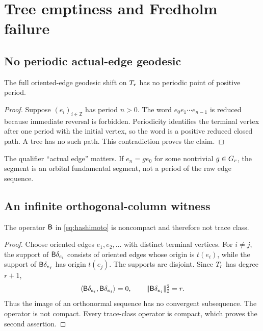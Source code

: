 \section{Tree emptiness and Fredholm failure}
\label{sec:tree-fredholm}

\subsection{No periodic actual-edge geodesic}

\begin{lemma}
\label{lem:no-period}
The full oriented-edge geodesic shift on $T_r$ has no periodic point of
positive period.
\end{lemma}

\begin{proof}
Suppose $(e_i)_{i\in\mathbb Z}$ has period $n>0$.  The word
$e_0e_1\cdots e_{n-1}$ is reduced because immediate reversal is forbidden.
Periodicity identifies the terminal vertex after one period with the initial
vertex, so the word is a positive reduced closed path.  A tree has no such
path.  This contradiction proves the claim.
\end{proof}

The qualifier ``actual edge'' matters.  If $e_n=g e_0$ for some nontrivial
$g\in G_r$, the segment is an orbital fundamental segment, not a period of the
raw edge sequence.

\subsection{An infinite orthogonal-column witness}

\begin{proposition}[Noncompactness]
\label{prop:noncompact}
The operator $\mathsf{B}$ in \eqref{eq:hashimoto} is noncompact and therefore not
trace class.
\end{proposition}

\begin{proof}
Choose oriented edges $e_1,e_2,\ldots$ with distinct terminal vertices.  For
$i\ne j$, the support of $\mathsf{B}\delta_{e_i}$ consists of oriented edges whose
origin is $t(e_i)$, while the support of $\mathsf{B}\delta_{e_j}$ has origin
$t(e_j)$.  The supports are disjoint.  Since $T_r$ has degree $r+1$,
\[
  \langle \mathsf{B}\delta_{e_i},\mathsf{B}\delta_{e_j}\rangle=0,
  \qquad
  \|\mathsf{B}\delta_{e_j}\|_2^2=r.
\]
Thus the image of an orthonormal sequence has no convergent subsequence.
The operator is not compact.  Every trace-class operator is compact, which
proves the second assertion.
\end{proof}

